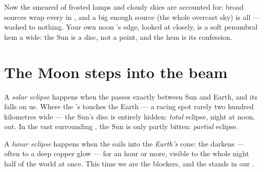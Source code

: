\begin{example}\label{ex:g7:shadows-eclipses:soft}
Now the smeared  of frosted lamps and cloudy skies are
accounted for: broad sources wrap every  in , and
a big enough source (the whole overcast sky) is all  ---
 washed to nothing. Your own noon 's edge, looked
at closely, is a soft penumbral hem a  wide: the Sun
is a disc, not a point, and the hem is its confession.
\end{example}

\section{The Moon steps into the beam}

\begin{definition}\label{def:g7:shadows-eclipses:solar}
A \emph{solar eclipse} happens when the
 passes exactly between Sun and Earth, and its  falls
on us. Where the 's \emph{} touches the Earth --- a
racing spot rarely two hundred kilometres wide --- the Sun's
disc is entirely hidden: \emph{total} eclipse, night at noon,
 out. In the vast surrounding \emph{}, the Sun is
only partly bitten: \emph{partial} eclipse.
\end{definition}

\begin{definition}\label{def:g7:shadows-eclipses:lunar}
A \emph{lunar eclipse} happens when the
\emph{} sails into the \emph{Earth's}  cone: the  darkens --- often to a deep copper glow --- for an hour or
more, visible to the whole night half of the world at once. This
time we are the blockers, and the  stands in our .
\end{definition}

